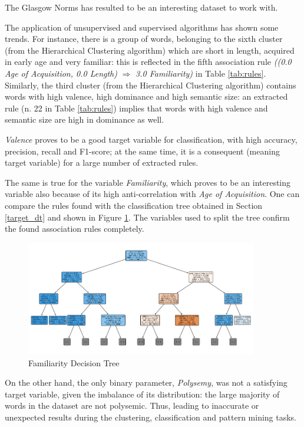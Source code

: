 \documentclass[a4paper,11pt,dvipsnames]{article}
\begin{document}
The Glasgow Norms has resulted to be an interesting dataset to work with.

The application of unsupervised and supervised algorithms has shown some trends. For instance, there is a group of words, belonging to the sixth cluster (from the Hierarchical Clustering algorithm) which are short in length, acquired in early age and very familiar: this is reflected in the fifth association rule \textit{((0.0 Age of Acquisition, 0.0 Length)} $\Rightarrow$ \textit{3.0 Familiarity)}
in Table \ref{tab:rules}. Similarly, the third cluster (from the Hierarchical Clustering algorithm) contains words with high valence, high dominance and high semantic size: an extracted rule (n. 22 in Table \ref{tab:rules}) implies that words with high valence and semantic size are high in dominance as well. 

\textit{Valence} proves to be a good target variable for classification, with high accuracy, precision, recall and F1-score; at the same time, it is a consequent (meaning target variable) for a large number of extracted rules. 

The same is true for the variable \textit{Familiarity}, which proves to be an interesting variable also because of its high anti-correlation with \textit{Age of Acquisition}. One can compare the rules found with the classification tree obtained in Section \ref{target_dt} and shown in Figure \ref{fig:tree_fam}. The variables used to split the tree confirm the found association rules completely.
\begin{figure}[h]
    \centering
    \includegraphics[width=0.9\textwidth]{fam_tree_entropy.png}
    \caption{Familiarity Decision Tree}
    \label{fig:tree_fam}
\end{figure}
On the other hand, the only binary parameter, \textit{Polysemy}, was not a satisfying target variable, given the imbalance of its distribution: the large majority of words in the dataset are not polysemic. Thus, leading to inaccurate or unexpected results during the clustering, %
classification and pattern mining tasks.



\newpage
\nocite{*}
\printbibliography
\end{document}
